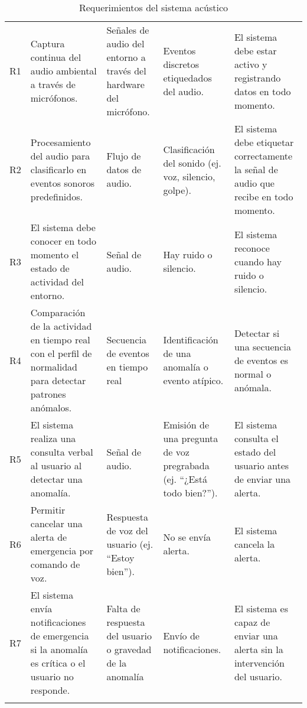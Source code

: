 {\begin{longtable}[c]{c p{3.5cm} p{2.2cm} p{2.2cm} p{3.5cm}}
    R1                     & Captura continua del audio ambiental a través de micrófonos.                                            & Señales de audio del entorno a través del hardware del micrófono. & Eventos discretos etiquedados del audio.                              & El sistema debe estar activo y registrando datos en todo momento.                     \\
    \addlinespace
    R2                     & Procesamiento del audio para clasificarlo en eventos sonoros predefinidos.                              & Flujo de datos de audio.                                          & Clasificación del sonido (ej. voz, silencio, golpe).                  & El sistema debe etiquetar correctamente la señal de audio que recibe en todo momento. \\
    \addlinespace
    R3                     & El sistema debe conocer en todo momento el estado de actividad del entorno.                             & Señal de audio.                                                   & Hay ruido o silencio.                                                 & El sistema reconoce cuando hay ruido o silencio.                                      \\
    \addlinespace
    R4                     & Comparación de la actividad en tiempo real con el perfil de normalidad para detectar patrones anómalos. & Secuencia de eventos en tiempo real                               & Identificación de una anomalía o evento atípico.                      & Detectar si una secuencia de eventos es normal o anómala.                             \\
    \addlinespace
    R5                     & El sistema realiza una consulta verbal al usuario al detectar una anomalía.                             & Señal de audio.                                                   & Emisión de una pregunta de voz pregrabada (ej. ``¿Está todo bien?''). & El sistema consulta el estado del usuario antes de enviar una alerta.                 \\
    \addlinespace
    R6                     & Permitir cancelar una alerta de emergencia por comando de voz.                                          & Respuesta de voz del usuario (ej. ``Estoy bien'').                & No se envía alerta.                                                   & El sistema cancela la alerta.                                                         \\
    \addlinespace
    R7                     & El sistema envía notificaciones de emergencia si la anomalía es crítica o el usuario no responde.       & Falta de respuesta del usuario o gravedad de la anomalía          & Envío de notificaciones.                                              & El sistema es capaz de enviar una alerta sin la intervención del usuario.             \\
    \bottomrule
    \addlinespace

    \caption{Requerimientos del sistema acústico}
    \label{tab:requerimientos_sistema_acustico}
  \end{longtable}
}

